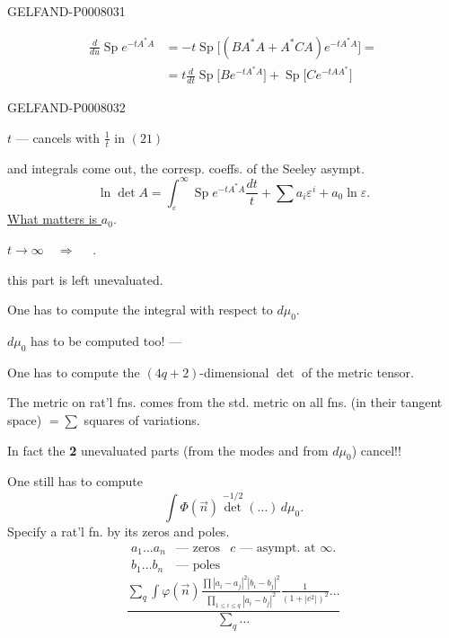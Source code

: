 \begin{GelfandAdjacentEvidence}{GELFAND-P000803}{1}

\begin{equation*}
\begin{aligned}
\frac{d}{du}\operatorname{Sp}e^{-tA^*A}
&=-t\operatorname{Sp}\bigl[(BA^*A+A^*CA)e^{-tA^*A}\bigr]=\\
&=t\frac{d}{dt}\operatorname{Sp}\bigl[Be^{-tA^*A}\bigr]
 +\operatorname{Sp}\bigl[Ce^{-tAA^*}\bigr]
\end{aligned}
\tag{22}
\end{equation*}
\end{GelfandAdjacentEvidence}
\begin{GelfandAdjacentEvidence}{GELFAND-P000803}{2}


\(t\) --- cancels with \(\frac{1}{t}\) in \((21)\)

and integrals come out, the corresp. coeffs. of the Seeley asympt.
\[
\ln\det A=\int_\varepsilon^\infty\operatorname{Sp}e^{-tA^*A}\frac{dt}{t}
 +\sum a_i\varepsilon^i+a_0\ln\varepsilon.
\]
\underline{\underline{What matters is \(a_0\)}}.

\(t\to\infty\quad\Rightarrow\quad\) .

this part is left unevaluated.

One has to compute the integral with respect to \(d\mu_0\).

\(d\mu_0\) has to be computed too! --- 

One has to compute the \((4q+2)\)-dimensional \(\det\) of the metric tensor.

The metric on rat’l fns. comes from the std. metric on all fns. (in their tangent space) \(=\sum\) squares of variations.

In fact the \textbf{2} unevaluated parts (from the modes and from \(d\mu_0\)) cancel!!

One still has to compute
\[
\int\Phi(\vec n)\det^{-1/2}(\ldots)\,d\mu_0.
\]
Specify a rat’l fn. by its zeros and poles.
\[
\begin{array}{ll|l}
a_1\ldots a_n&\text{--- zeros}&c\text{ --- asympt. at }\infty.\\
b_1\ldots b_n&\text{--- poles}&
\end{array}
\]
\[
\frac{
 \displaystyle\sum_q\int\varphi(\vec n)
 \frac{\prod |a_i-a_j|^2|b_i-b_j|^2}
 {\prod_{1\le i\le q}|a_i-b_j|^2}
 \frac{1}{(1+|c^2|)^2}\ldots
}{\displaystyle\sum_q\ldots}
\]
\end{GelfandAdjacentEvidence}
